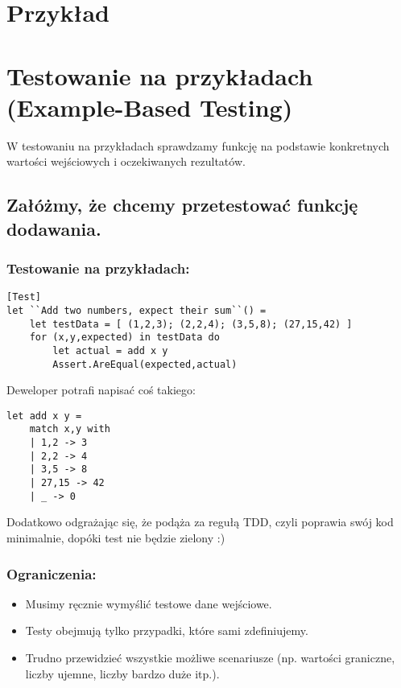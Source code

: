\section{Przykład}

\section*{Testowanie na przykładach (Example-Based Testing)}

W testowaniu na przykładach sprawdzamy funkcję na podstawie konkretnych wartości wejściowych i oczekiwanych rezultatów.

\subsection*{Załóżmy, że chcemy przetestować funkcję dodawania.}

\subsubsection*{Testowanie na przykładach:}
\lstset{language=FSharp, basicstyle=\scriptsize}
\begin{lstlisting}[frame=single,caption={Testowanie na przykładach},label=kod:listingA]
[Test]
let ``Add two numbers, expect their sum``() =
    let testData = [ (1,2,3); (2,2,4); (3,5,8); (27,15,42) ]
    for (x,y,expected) in testData do
        let actual = add x y
        Assert.AreEqual(expected,actual)
\end{lstlisting}

Deweloper potrafi napisać coś takiego:
\lstset{language=FSharp, basicstyle=\scriptsize}
\begin{lstlisting}[frame=single,caption={Testowany kod},label=kod:listingA]
let add x y =
    match x,y with
    | 1,2 -> 3
    | 2,2 -> 4
    | 3,5 -> 8
    | 27,15 -> 42
    | _ -> 0
\end{lstlisting}

Dodatkowo odgrażając się, że podąża za regułą TDD, czyli poprawia swój kod minimalnie, dopóki test nie będzie zielony :)

\subsubsection*{Ograniczenia:}
\begin{itemize}
    \item Musimy ręcznie wymyślić testowe dane wejściowe.
    \item Testy obejmują tylko przypadki, które sami zdefiniujemy.
    \item Trudno przewidzieć wszystkie możliwe scenariusze (np. wartości graniczne, liczby ujemne, liczby bardzo duże itp.).
\end{itemize}

